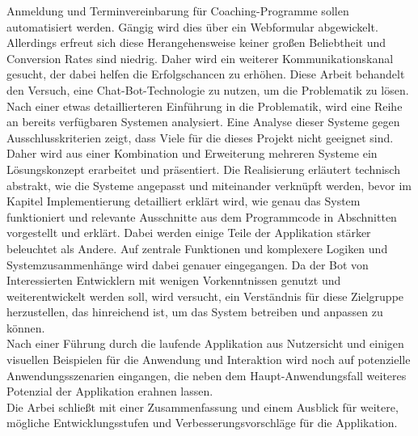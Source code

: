 \kurzfassung

Anmeldung und Terminvereinbarung für Coaching-Programme sollen automatisiert werden. Gängig wird dies über ein Webformular abgewickelt. Allerdings erfreut sich diese Herangehensweise keiner großen Beliebtheit und Conversion Rates sind niedrig. Daher wird ein weiterer Kommunikationskanal gesucht, der dabei helfen die Erfolgschancen zu erhöhen. Diese Arbeit behandelt den Versuch, eine Chat-Bot-Technologie zu nutzen, um die Problematik zu lösen. Nach einer etwas detaillierteren Einführung in die Problematik, wird eine Reihe an bereits verfügbaren Systemen analysiert. Eine Analyse dieser Systeme gegen Ausschlusskriterien zeigt, dass Viele für die dieses Projekt nicht geeignet sind. Daher wird aus einer Kombination und Erweiterung mehreren Systeme ein Lösungskonzept erarbeitet und präsentiert. Die Realisierung erläutert technisch abstrakt, wie die Systeme angepasst und miteinander verknüpft werden, bevor im Kapitel Implementierung detailliert erklärt wird, wie genau das System funktioniert und relevante Ausschnitte aus dem Programmcode in Abschnitten vorgestellt und erklärt. Dabei werden einige Teile der Applikation stärker beleuchtet als Andere. Auf zentrale Funktionen und komplexere Logiken und Systemzusammenhänge wird dabei genauer eingegangen. Da der Bot von Interessierten Entwicklern mit wenigen Vorkenntnissen genutzt und weiterentwickelt werden soll, wird versucht, ein Verständnis für diese Zielgruppe herzustellen, das hinreichend ist, um das System betreiben und anpassen zu können. \\
Nach einer Führung durch die laufende Applikation aus Nutzersicht und einigen visuellen Beispielen für die Anwendung und Interaktion wird noch auf potenzielle Anwendungsszenarien eingangen, die neben dem Haupt-Anwendungsfall weiteres Potenzial der Applikation erahnen lassen. \\
Die Arbei schließt mit einer Zusammenfassung und einem Ausblick für weitere, mögliche Entwicklungsstufen und Verbesserungsvorschläge für die Applikation. 

\kurzfassungEN

